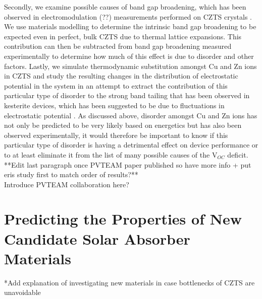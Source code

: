 Secondly, we examine possible causes of band gap broadening, which has been observed in electromodulation (??) measurements performed on CZTS crystals \cite{PVTEAM_paper}. We use materials modelling to determine the intrinsic band gap broadening to be expected even in perfect, bulk CZTS due to thermal lattice expansions. This contribution can then be subtracted from band gap broadening measured experimentally to determine how much of this effect is due to disorder and other factors. 
Lastly, we simulate thermodynamic substitution amongst Cu and Zn ions in CZTS and study the resulting changes in the distribution of electrostatic potential in the system in an attempt to extract the contribution of this particular type of disorder to the strong band tailing that has been observed in kesterite devices, which has been suggested to be due to fluctuations in electrostatic potential \cite{band_tail}.
As discussed above, disorder amongst Cu and Zn ions has not only be predicted to be very likely based on energetics but has also been observed experimentally, it would therefore be important to know if this particular type of disorder is having a detrimental effect on device performance or to at least eliminate it from the list of many possible causes of the V$_{OC}$ deficit.\\
**Edit last paragraph once PVTEAM paper published so have more info + put eris study first to match order of results?**\\

Introduce PVTEAM collaboration here?
 


\section{Predicting the Properties of New Candidate Solar Absorber Materials}\label{sulfosalts_intro}
*Add explanation of investigating new materials in case bottlenecks of CZTS are unavoidable\\

